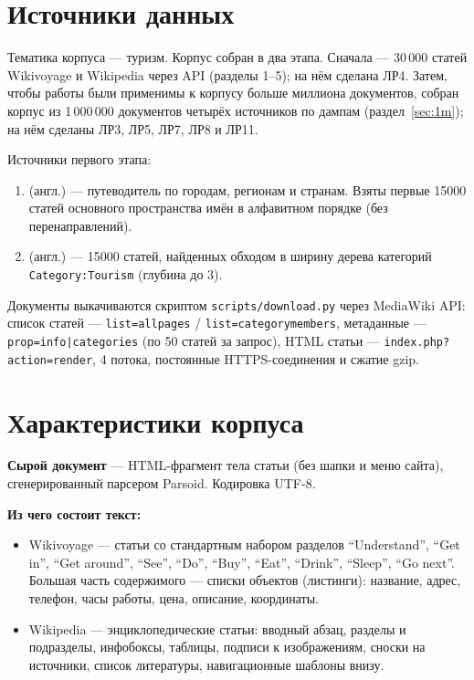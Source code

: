 \section{Источники данных}
Тематика корпуса --- туризм. Корпус собран в два этапа. Сначала --- 30\,000 статей Wikivoyage и Wikipedia через API (разделы 1--5); на нём сделана ЛР4. Затем, чтобы работы были применимы к корпусу больше миллиона документов, собран корпус из 1\,000\,000 документов четырёх источников по дампам (раздел~\ref{sec:1m}); на нём сделаны ЛР3, ЛР5, ЛР7, ЛР8 и ЛР11.

Источники первого этапа:
\begin{enumerate}
    \item {} (англ.) --- путеводитель по городам, регионам и странам. Взяты первые 15000 статей основного пространства имён в алфавитном порядке (без перенаправлений).
    \item {} (англ.) --- 15000 статей, найденных обходом в ширину дерева категорий \texttt{Category:Tourism} (глубина до 3).
\end{enumerate}

Документы выкачиваются скриптом \texttt{scripts/download.py} через MediaWiki API: список статей --- \texttt{list=allpages} / \texttt{list=categorymembers}, метаданные --- \texttt{prop=info|categories} (по 50 статей за запрос), HTML статьи --- \texttt{index.php?action=render}, 4 потока, постоянные HTTPS-соединения и сжатие gzip.

\section{Характеристики корпуса}
\textbf{Сырой документ} --- HTML-фрагмент тела статьи (без шапки и меню сайта), сгенерированный парсером Parsoid. Кодировка UTF-8.

\textbf{Из чего состоит текст:}
\begin{itemize}
    \item Wikivoyage --- статьи со стандартным набором разделов \enquote{Understand}, \enquote{Get in}, \enquote{Get around}, \enquote{See}, \enquote{Do}, \enquote{Buy}, \enquote{Eat}, \enquote{Drink}, \enquote{Sleep}, \enquote{Go next}. Большая часть содержимого --- списки объектов (листинги): название, адрес, телефон, часы работы, цена, описание, координаты.
    \item Wikipedia --- энциклопедические статьи: вводный абзац, разделы и подразделы, инфобоксы, таблицы, подписи к изображениям, сноски на источники, список литературы, навигационные шаблоны внизу.
\end{itemize}

